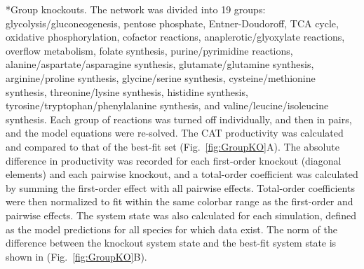 \documentclass[12pt]{article}
\makeatletter
\renewcommand\subsection{\@startsection
	{subsection}{2}{0mm}
	{-0.05in}
	{-0.5\baselineskip}
	{\normalfont\normalsize\bfseries}}
\newcommand{\norm}[1]{\left\lVert#1\right\rVert}
\makeatother
\begin{document}
\subsection*{Group knockouts.}
The network was divided into 19 groups: glycolysis/gluconeogenesis, pentose phosphate, Entner-Doudoroff, TCA cycle, oxidative phosphorylation, cofactor reactions, anaplerotic/glyoxylate reactions, overflow metabolism, folate synthesis, purine/pyrimidine reactions, alanine/aspartate/asparagine synthesis, glutamate/glutamine synthesis, arginine/proline synthesis, glycine/serine synthesis, cysteine/methionine synthesis, threonine/lysine synthesis, histidine synthesis, tyrosine/tryptophan/phenylalanine synthesis, and valine/leucine/isoleucine synthesis.
Each group of reactions was turned off individually, and then in pairs, and the model equations were re-solved.
The CAT productivity was calculated and compared to that of the best-fit set (Fig.~\ref{fig:GroupKO}A).
The absolute difference in productivity was recorded for each first-order knockout (diagonal elements) and each pairwise knockout, and a total-order coefficient was calculated by summing the first-order effect with all pairwise effects.
Total-order coefficients were then normalized to fit within the same colorbar range as the first-order and pairwise effects.
The system state was also calculated for each simulation, defined as the model predictions for all species for which data exist.
The norm of the difference between the knockout system state and the best-fit system state is shown in (Fig.~\ref{fig:GroupKO}B).

\end{document}
